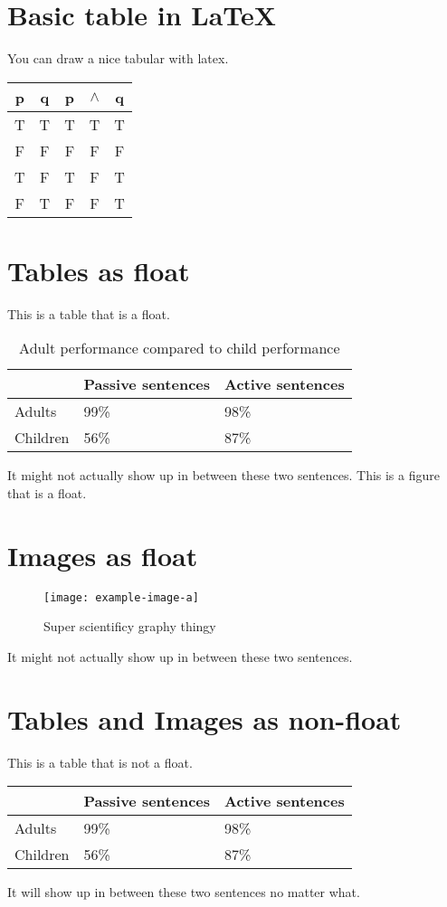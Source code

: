 \documentclass{article}
\begin{document}
\section{Basic table in \LaTeX{}}
 You can draw a nice tabular with latex.\\
                           \begin{tabular}{cc|ccc}
                                   p & q & p & $\wedge $ & q \\
                                   \hline
                                    T & T & T & T & T \\
                                    F & F & F & F & F \\
                                    T & F & T & F & T \\
                                    F & T & F & F & T 
\end{tabular}


\section{Tables as float}
This is a table that is a float.
\begin{table}[htbp]
\centering %
\begin{tabular}{lll}
\toprule
& Passive sentences & Active sentences \\ \midrule
Adults & 99\% & 98\% \\
Children & 56\% & 87\% \\
\bottomrule
\end{tabular}
\caption{Adult performance compared to child performance}
\end{table}
It might not actually show up in between these two sentences.
This is a figure that is a float.


\section{Images as float}
\begin{figure}[htbp]
\centering
\texttt{[image: example-image-a]}
\caption{Super scientificy graphy thingy}
\end{figure}
It might not actually show up in between these two sentences.


\section{Tables and Images as non-float}
This is a table that is not a float.
\begin{center}
\begin{tabular}{lll}
\toprule
& Passive sentences & Active sentences \\ \midrule
Adults & 99\% & 98\% \\
Children & 56\% & 87\% \\
\bottomrule
\end{tabular}
\end{center}
It will show up in between these two sentences no matter what.
\end{document}
